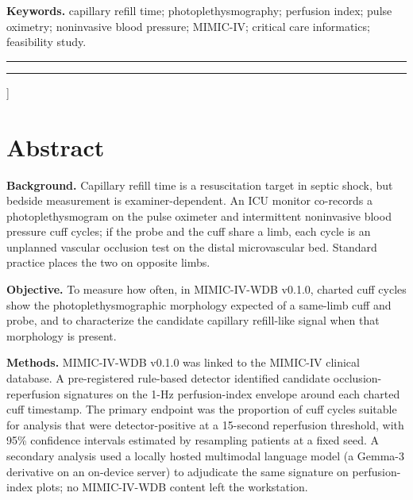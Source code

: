 \documentclass[twocolumn,letterpaper,10pt]{article}
\newcommand{\accenttitlerule}{%
  {\color{accent}\rule{\textwidth}{1.1pt}}\par\vspace{2pt}%
  {\color{accent}\rule{\textwidth}{0.4pt}}\par}
\begin{document}
  \textbf{Keywords.} capillary refill time; photoplethysmography; perfusion index; pulse oximetry; noninvasive blood pressure; MIMIC-IV; critical care informatics; feasibility study.
  \par\endgroup
  \vspace{0.4em}
  \accenttitlerule
  \vspace{0.9em}
]

\iffalse
\section*{Abstract}

\textbf{Background.} Capillary refill time is a resuscitation target in septic shock,\cite{hernandez2019_andromeda,zampieri2020_bayesian,andromedashock2_2025,jacquetlagreze2023_crt_metaanalysis} but bedside measurement is examiner-dependent. An ICU monitor co-records a photoplethysmogram on the pulse oximeter and intermittent noninvasive blood pressure cuff cycles; if the probe and the cuff share a limb, each cycle is an unplanned vascular occlusion test on the distal microvascular bed. Standard practice places the two on opposite limbs.

\textbf{Objective.} To measure how often, in MIMIC-IV-WDB v0.1.0, charted cuff cycles show the photoplethysmographic morphology expected of a same-limb cuff and probe, and to characterize the candidate capillary refill-like signal when that morphology is present.

\textbf{Methods.} MIMIC-IV-WDB v0.1.0\cite{moody2022_wdb} was linked to the MIMIC-IV clinical database.\cite{johnson2023_mimic4} A pre-registered rule-based detector identified candidate occlusion-reperfusion signatures on the 1-Hz perfusion-index envelope around each charted cuff timestamp. The primary endpoint was the proportion of cuff cycles suitable for analysis that were detector-positive at a 15-second reperfusion threshold, with 95\% confidence intervals estimated by resampling patients at a fixed seed. A secondary analysis used a locally hosted multimodal language model (a Gemma-3 derivative on an on-device server) to adjudicate the same signature on perfusion-index plots; no MIMIC-IV-WDB content left the workstation.
\end{document}
